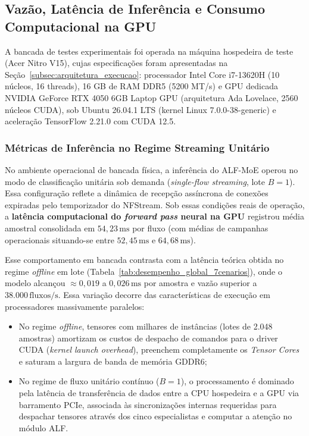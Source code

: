 \subsection{Vazão, Latência de Inferência e Consumo Computacional na GPU}
\label{subsec:throughput_latencia_consumo}

A bancada de testes experimentais foi operada na máquina hospedeira de teste (Acer Nitro V15), cujas
especificações foram apresentadas na Seção~\ref{subsec:arquitetura_execucao}: processador Intel Core
i7-13620H (10 núcleos, 16 threads), 16 GB de RAM DDR5 (5200 MT/s) e GPU dedicada NVIDIA GeForce RTX 4050
6GB Laptop GPU (arquitetura Ada Lovelace, 2560 núcleos CUDA), sob Ubuntu 26.04.1 LTS (kernel Linux
7.0.0-38-generic) e aceleração TensorFlow 2.21.0 com CUDA 12.5.

\subsubsection{Métricas de Inferência no Regime Streaming Unitário}

No ambiente operacional de bancada física, a inferência do ALF-MoE operou no modo de classificação
unitária sob demanda (\emph{single-flow streaming}, lote $B = 1$). Essa configuração reflete a dinâmica
de recepção assíncrona de conexões expiradas pelo temporizador do NFStream. Sob essas condições reais de
operação, a \textbf{latência computacional do \emph{forward pass} neural na GPU} registrou média amostral
consolidada em \textbf{$54{,}23\,\mathrm{ms}$} por fluxo (com médias de campanhas operacionais situando-se
entre $52{,}45\,\mathrm{ms}$ e $64{,}68\,\mathrm{ms}$).

Esse comportamento em bancada contrasta com a latência teórica obtida no regime \emph{offline} em lote
(Tabela~\ref{tab:desempenho_global_7cenarios}), onde o modelo alcançou $\approx 0{,}019$ a
$0{,}026\,\mathrm{ms}$ por amostra e vazão superior a $38.000\,\mathrm{fluxos/s}$. Essa variação
decorre das características de execução em processadores massivamente paralelos:
\begin{itemize}
    \item No regime \emph{offline}, tensores com milhares de instâncias (lotes de 2.048 amostras)
    amortizam os custos de despacho de comandos para o driver CUDA (\emph{kernel launch overhead}),
    preenchem completamente os \emph{Tensor Cores} e saturam a largura de banda de memória GDDR6;
    
    \item No regime de fluxo unitário contínuo ($B=1$), o processamento é dominado pela latência de
    transferência de dados entre a CPU hospedeira e a GPU via barramento PCIe, associada às sincronizações
    internas requeridas para despachar tensores através dos cinco especialistas e computar a atenção no
    módulo ALF.
\end{itemize}

